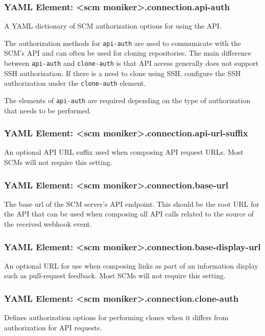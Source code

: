 \subsubsection{YAML Element: <scm moniker>.connection.api-auth}\label{sec:yaml-connection-api-auth}
A YAML dictionary of SCM authorization options for using the API.

The authorization methods for \texttt{api-auth} 
are used to communicate with the SCM's API and can often be used for cloning repositories.  The
main difference between \texttt{api-auth} and \texttt{clone-auth} is that API access generally
does not support SSH authorization. If there is a need to clone using SSH, configure the SSH
authorization under the \texttt{clone-auth} element.  

The elements of \texttt{api-auth} are required depending on the type of authorization that
needs to be performed.

\subsubsection{YAML Element: <scm moniker>.connection.api-url-suffix}\label{sec:yaml-connection-api-url-suffix}
An optional API URL suffix used when composing API request URLs. Most SCMs will not require this setting.

\subsubsection{YAML Element: <scm moniker>.connection.base-url}\label{sec:yaml-connection-base-url}
The base url of the SCM server's API endpoint. This should be the root URL for the API that can be used when composing all
API calls related to the source of the received webhook event.

\subsubsection{YAML Element: <scm moniker>.connection.base-display-url}\label{sec:yaml-connection-base-display-url}
An optional URL for use when composing links as part of an information display such as pull-request
feedback. Most SCMs will not require this setting.

\subsubsection{YAML Element: <scm moniker>.connection.clone-auth}\label{sec:yaml-connection-clone-auth}
Defines authorization options for performing clones when it differs from authorization for API requests.

